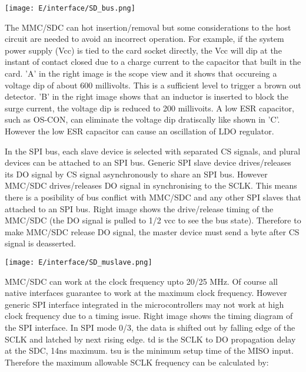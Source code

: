 \bigskip
\noindent\texttt{[image: E/interface/SD\_bus.png]}
\bigskip

The MMC/SDC can hot insertion/removal but some considerations to the host
circuit are needed to avoid an incorrect operation. For example, if the system
power supply (Vcc) is tied to the card socket directly, the Vcc will dip at the
instant of contact closed due to a charge current to the capacitor that built in
the card. 'A' in the right image is the scope view and it shows that occureing a
voltage dip of about 600 millivolts. This is a sufficient level to trigger a
brown out detector. 'B' in the right image shows that an inductor is inserted to
block the surge current, the voltage dip is reduced to 200 millivoits. A low ESR
capacitor, such as OS-CON, can eliminate the voltage dip dratiscally like shown
in 'C'. However the low ESR capacitor can cause an oscillation of LDO regulator.


In the SPI bus, each slave device is selected with separated CS signals, and
plural devices can be attached to an SPI bus. Generic SPI slave device
drives/releases its DO signal by CS signal asynchronously to share an SPI bus.
However MMC/SDC drives/releases DO signal in synchronising to the SCLK. This
means there is a posibility of bus conflict with MMC/SDC and any other SPI
slaves that attached to an SPI bus. Right image shows the drive/release timing
of the MMC/SDC (the DO signal is pulled to 1/2 vcc to see the bus state).
Therefore to make MMC/SDC release DO signal, the master device must send a byte
after CS signal is deasserted.

\bigskip
\noindent\texttt{[image: E/interface/SD\_muslave.png]}
\bigskip


MMC/SDC can work at the clock frequency upto 20/25 MHz. Of course all native
interfaces guarantee to work at the maximum clock frequency. However generic SPI
interface integrated in the microcontrollers may not work at high clock
frequency due to a timing issue. Right image shows the timing diagram of the SPI
interface. In SPI mode 0/3, the data is shifted out by falling edge of the SCLK
and latched by next rising edge. td is the SCLK to DO propagation delay at the
SDC, 14ns maximum. tsu is the minimum setup time of the MISO input. Therefore
the maximum allowable SCLK frequency can be calculated by:

